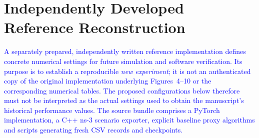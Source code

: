 \documentclass[pdflatex,sn-mathphys-num]{sn-jnl}
\newcommand{\Revised}[1]{\textcolor{blue}{#1}}
\begin{document}
% 
% 


\section{Independently Developed Reference Reconstruction}
\label{app:newreconstruction}
\Revised{A separately prepared, independently written reference implementation defines concrete numerical settings for future simulation and software verification. Its purpose is to establish a reproducible \emph{new experiment}; it is not an authenticated copy of the original implementation underlying Figures~4--10 or the corresponding numerical tables. The proposed configurations below therefore must not be interpreted as the actual settings used to obtain the manuscript's historical performance values. The source bundle comprises a PyTorch implementation, a C++ ns-3 scenario exporter, explicit baseline proxy algorithms and scripts generating fresh CSV records and checkpoints.}
\end{document}
